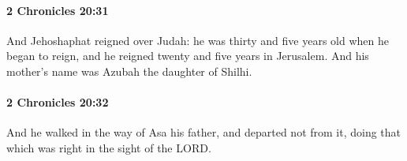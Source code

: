 		\paragraph{2 Chronicles 20:31} %
			\label{2CHRONICLES-20-31}

			And Jehoshaphat reigned over Judah: he was thirty and five years old when he began to reign, and he reigned twenty and five years in Jerusalem. And his mother's name was Azubah the daughter of Shilhi.


		\paragraph{2 Chronicles 20:32} %
			\label{2CHRONICLES-20-32}

			And he walked in the way of Asa his father, and departed not from it, doing that which was right in the sight of the LORD.


